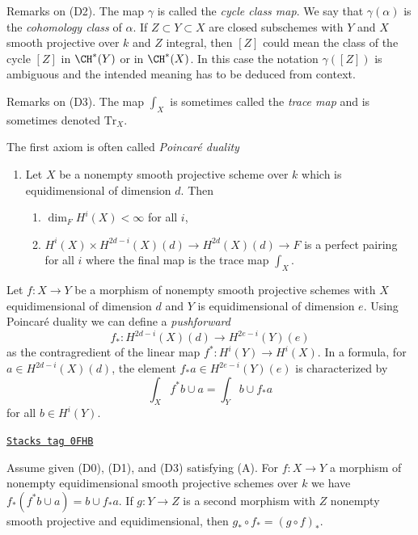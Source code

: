 \medskip\noindent
Remarks on (D2). The map $\gamma$ is called the {\it cycle class map}.
We say that $\gamma(\alpha)$ is the {\it cohomology class} of $\alpha$.
If $Z \subset Y \subset X$ are closed subschemes with $Y$ and $X$
smooth projective over $k$ and $Z$ integral, then $[Z]$ could
mean the class of the cycle $[Z]$ in $\CH^*(Y)$ or in $\CH^*(X)$.
In this case the notation $\gamma([Z])$ is ambiguous and the intended meaning
has to be deduced from context.

\medskip\noindent
Remarks on (D3). The map $\int_X$ is sometimes called the
{\it trace map} and is sometimes denoted $\text{Tr}_X$.

\medskip\noindent
The first axiom is often called {\it Poincar\'e duality}
\begin{enumerate}
\item[(A)] Let $X$ be a nonempty smooth projective scheme over $k$
which is equidimensional of dimension $d$. Then
\begin{enumerate}
\item $\dim_F H^i(X) < \infty$ for all $i$,
\item $H^i(X) \times H^{2d - i}(X)(d) \rightarrow
H^{2d}(X)(d) \rightarrow F$
is a perfect pairing for all $i$ where the final
map is the trace map $\int_X$.
\end{enumerate}
\end{enumerate}
Let $f : X \to Y$ be a morphism of nonempty smooth projective schemes with $X$
equidimensional of dimension $d$ and $Y$ is equidimensional of dimension $e$.
Using Poincar\'e duality we can define a {\it pushforward}
$$
f_* : H^{2d - i}(X)(d) \longrightarrow H^{2e - i}(Y)(e)
$$
as the contragredient of the linear map $f^* : H^i(Y) \to H^i(X)$. In a
formula, for $a \in H^{2d - i}(X)(d)$, the element $f_*a \in H^{2e - i}(Y)(e)$
is characterized by
$$
\int_X f^*b \cup a = \int_Y b \cup f_*a
$$
for all $b \in H^i(Y)$.

\begin{lemma}[Pushforward]
\label{weil-lemma-pushforward}
\href{https://stacks.math.columbia.edu/tag/0FHB}{\texttt{Stacks tag 0FHB}}

Assume given (D0), (D1), and (D3) satisfying (A). For $f : X \to Y$
a morphism of nonempty equidimensional smooth projective schemes over $k$
we have $f_*(f^*b \cup a) = b \cup f_*a$. If $g : Y \to Z$ is a second morphism
with $Z$ nonempty smooth projective and equidimensional, then
$g_* \circ f_* = (g \circ f)_*$.
\end{lemma}

